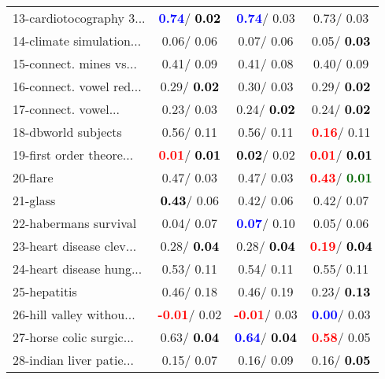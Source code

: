 \begin{table}[h]
\begin{center}
\begin{tabular}{lc|c|c}
13-cardiotocography 3... & \textcolor{blue}{\textbf{  0.74}}/\textcolor{black}{\textbf{  0.02}} & \textcolor{blue}{\textbf{  0.74}}/  0.03 &   0.73/  0.03 \\
14-climate simulation... &   0.06/  0.06 &   0.07/  0.06 &   0.05/\textcolor{black}{\textbf{  0.03}} \\ \hline
15-connect. mines vs... &   0.41/  0.09 &   0.41/  0.08 &   0.40/  0.09 \\
16-connect. vowel red... &   0.29/\textcolor{black}{\textbf{  0.02}} &   0.30/  0.03 &   0.29/\textcolor{black}{\textbf{  0.02}} \\
17-connect. vowel... &   0.23/  0.03 &   0.24/\textcolor{black}{\textbf{  0.02}} &   0.24/\textcolor{black}{\textbf{  0.02}} \\
18-dbworld subjects &   0.56/  0.11 &   0.56/  0.11 & \textcolor{red}{\textbf{  0.16}}/  0.11 \\
19-first order theore... & \textcolor{red}{\textbf{  0.01}}/\textcolor{black}{\textbf{  0.01}} & \textcolor{black}{\textbf{  0.02}}/  0.02 & \textcolor{red}{\textbf{  0.01}}/\textcolor{black}{\textbf{  0.01}} \\
20-flare &   0.47/  0.03 &   0.47/  0.03 & \textcolor{red}{\textbf{  0.43}}/\textcolor{darkgreen}{\textbf{  0.01}} \\
21-glass & \textcolor{black}{\textbf{  0.43}}/  0.06 &   0.42/  0.06 &   0.42/  0.07 \\ \hline
22-habermans survival &   0.04/  0.07 & \textcolor{blue}{\textbf{  0.07}}/  0.10 &   0.05/  0.06 \\
23-heart disease clev... &   0.28/\textcolor{black}{\textbf{  0.04}} &   0.28/\textcolor{black}{\textbf{  0.04}} & \textcolor{red}{\textbf{  0.19}}/\textcolor{black}{\textbf{  0.04}} \\
24-heart disease hung... &   0.53/  0.11 &   0.54/  0.11 &   0.55/  0.11 \\
25-hepatitis &   0.46/  0.18 &   0.46/  0.19 &   0.23/\textcolor{black}{\textbf{  0.13}} \\
26-hill valley withou... & \textcolor{red}{\textbf{ -0.01}}/  0.02 & \textcolor{red}{\textbf{ -0.01}}/  0.03 & \textcolor{blue}{\textbf{  0.00}}/  0.03 \\
27-horse colic surgic... &   0.63/\textcolor{black}{\textbf{  0.04}} & \textcolor{blue}{\textbf{  0.64}}/\textcolor{black}{\textbf{  0.04}} & \textcolor{red}{\textbf{  0.58}}/  0.05 \\
28-indian liver patie... &   0.15/  0.07 &   0.16/  0.09 &   0.16/\textcolor{black}{\textbf{  0.05}} \\ \hline

\end{tabular}
\end{center}
\end{table}
